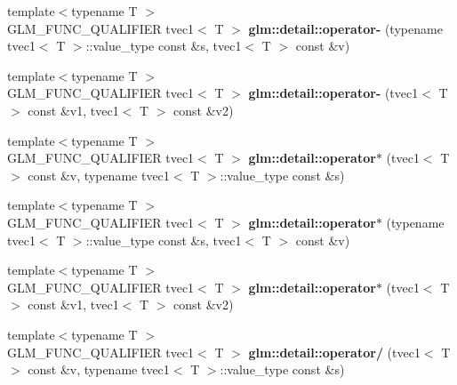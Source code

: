 \begin{DoxyCompactItemize}
\item 
\hypertarget{namespaceglm_1_1detail_abfb3bb0f7c5149426afe27f823a7d7fa}{{\footnotesize template$<$typename T $>$ }\\G\-L\-M\-\_\-\-F\-U\-N\-C\-\_\-\-Q\-U\-A\-L\-I\-F\-I\-E\-R tvec1$<$ T $>$ {\bfseries glm\-::detail\-::operator-\/} (typename tvec1$<$ T $>$\-::value\-\_\-type const \&s, tvec1$<$ T $>$ const \&v)}\label{namespaceglm_1_1detail_abfb3bb0f7c5149426afe27f823a7d7fa}

\item 
\hypertarget{namespaceglm_1_1detail_a3343759099fcd3eda38f3faf618aeca8}{{\footnotesize template$<$typename T $>$ }\\G\-L\-M\-\_\-\-F\-U\-N\-C\-\_\-\-Q\-U\-A\-L\-I\-F\-I\-E\-R tvec1$<$ T $>$ {\bfseries glm\-::detail\-::operator-\/} (tvec1$<$ T $>$ const \&v1, tvec1$<$ T $>$ const \&v2)}\label{namespaceglm_1_1detail_a3343759099fcd3eda38f3faf618aeca8}

\item 
\hypertarget{namespaceglm_1_1detail_a4d99f64025983c46ebe26b241202369f}{{\footnotesize template$<$typename T $>$ }\\G\-L\-M\-\_\-\-F\-U\-N\-C\-\_\-\-Q\-U\-A\-L\-I\-F\-I\-E\-R tvec1$<$ T $>$ {\bfseries glm\-::detail\-::operator$\ast$} (tvec1$<$ T $>$ const \&v, typename tvec1$<$ T $>$\-::value\-\_\-type const \&s)}\label{namespaceglm_1_1detail_a4d99f64025983c46ebe26b241202369f}

\item 
\hypertarget{namespaceglm_1_1detail_a46da341cfc3cfd768914e7270ff6da80}{{\footnotesize template$<$typename T $>$ }\\G\-L\-M\-\_\-\-F\-U\-N\-C\-\_\-\-Q\-U\-A\-L\-I\-F\-I\-E\-R tvec1$<$ T $>$ {\bfseries glm\-::detail\-::operator$\ast$} (typename tvec1$<$ T $>$\-::value\-\_\-type const \&s, tvec1$<$ T $>$ const \&v)}\label{namespaceglm_1_1detail_a46da341cfc3cfd768914e7270ff6da80}

\item 
\hypertarget{namespaceglm_1_1detail_ad79aa7a83a2f742150cfa5c75bcbb5bb}{{\footnotesize template$<$typename T $>$ }\\G\-L\-M\-\_\-\-F\-U\-N\-C\-\_\-\-Q\-U\-A\-L\-I\-F\-I\-E\-R tvec1$<$ T $>$ {\bfseries glm\-::detail\-::operator$\ast$} (tvec1$<$ T $>$ const \&v1, tvec1$<$ T $>$ const \&v2)}\label{namespaceglm_1_1detail_ad79aa7a83a2f742150cfa5c75bcbb5bb}

\item 
\hypertarget{namespaceglm_1_1detail_ac91309d88faf4b29df645cd31148aee7}{{\footnotesize template$<$typename T $>$ }\\G\-L\-M\-\_\-\-F\-U\-N\-C\-\_\-\-Q\-U\-A\-L\-I\-F\-I\-E\-R tvec1$<$ T $>$ {\bfseries glm\-::detail\-::operator/} (tvec1$<$ T $>$ const \&v, typename tvec1$<$ T $>$\-::value\-\_\-type const \&s)}\label{namespaceglm_1_1detail_ac91309d88faf4b29df645cd31148aee7}


\end{DoxyCompactItemize}
